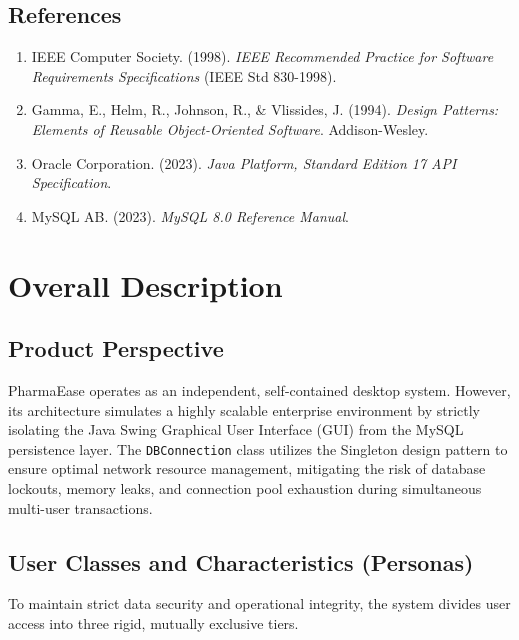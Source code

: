 \documentclass[12pt,a4paper]{report}
\begin{document}
\section{References}
\begin{enumerate}
    \item IEEE Computer Society. (1998). \textit{IEEE Recommended Practice for Software Requirements Specifications} (IEEE Std 830-1998).
    \item Gamma, E., Helm, R., Johnson, R., \& Vlissides, J. (1994). \textit{Design Patterns: Elements of Reusable Object-Oriented Software}. Addison-Wesley.
    \item Oracle Corporation. (2023). \textit{Java Platform, Standard Edition 17 API Specification}.
    \item MySQL AB. (2023). \textit{MySQL 8.0 Reference Manual}.
\end{enumerate}

\clearpage

\chapter{Overall Description}

\section{Product Perspective}
PharmaEase operates as an independent, self-contained desktop system. However, its architecture simulates a highly scalable enterprise environment by strictly isolating the Java Swing Graphical User Interface (GUI) from the MySQL persistence layer. The \texttt{DBConnection} class utilizes the Singleton design pattern to ensure optimal network resource management, mitigating the risk of database lockouts, memory leaks, and connection pool exhaustion during simultaneous multi-user transactions.

\section{User Classes and Characteristics (Personas)}
To maintain strict data security and operational integrity, the system divides user access into three rigid, mutually exclusive tiers.
\end{document}
